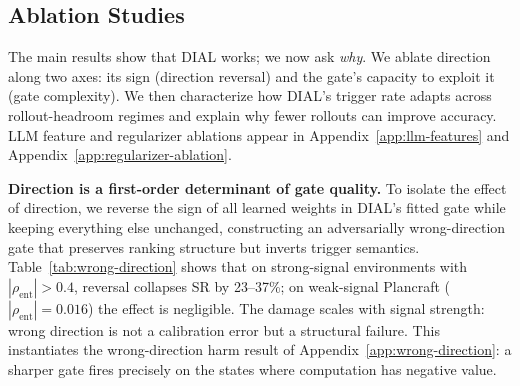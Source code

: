\vspace{-0.15in}
\subsection{Ablation Studies}
\label{sec:ablation}
\vspace{-0.1in}
The main results show that DIAL works; we now ask
\emph{why}. We ablate direction along two axes: its sign
(direction reversal) and the gate's capacity to exploit it
(gate complexity). We then characterize how DIAL's trigger
rate adapts across rollout-headroom regimes and explain why fewer
rollouts can improve accuracy. LLM feature and
regularizer ablations appear in Appendix~\ref{app:llm-features}
and Appendix~\ref{app:regularizer-ablation}.

\begin{table}
\vspace{-12pt}
\caption{Effect of reversing DIAL's learned direction.
$\Delta$SR: reversed $-$ original. $|\rho_{\text{ent}}|$ is the
absolute Spearman correlation between token entropy and
optimizer utility. Degradation scales with $|\rho_{\text{ent}}|$.}
\vspace{-.05in}
\label{tab:wrong-direction}
\centering
{}
\vspace{-10pt}
\end{table}
\vspace{-0.025in}
\textbf{Direction is a first-order determinant of gate quality.}
To isolate the effect of direction, we reverse the sign of all learned weights in DIAL's fitted gate while keeping everything
else unchanged, constructing an adversarially wrong-direction gate that preserves ranking structure but inverts trigger
semantics. Table~\ref{tab:wrong-direction} shows that on strong-signal environments with $|\rho_{\text{ent}}| > 0.4$,
reversal collapses SR by 23--37\%; on weak-signal Plancraft ($|\rho_{\text{ent}}|{=}0.016$) the effect is negligible. The damage scales with signal strength: wrong direction is not a calibration error but a structural failure. This instantiates the
wrong-direction harm result of Appendix~\ref{app:wrong-direction}: a sharper gate fires precisely on the states where
computation has negative value.

